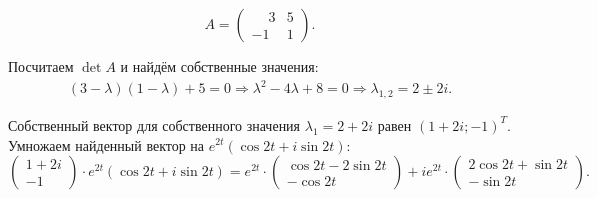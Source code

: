 \begin{ex}
$$
  A = 
  \begin{pmatrix}
    \phantom{-}3 & 5\\
    -1 & 1
  \end{pmatrix}.
$$

Посчитаем $\det{A}$ и найдём
собственные значения:
\begin{gather*}
  (3 - \lambda)(1 - \lambda) + 5 = 0 \Rightarrow
  \lambda^{2} - 4\lambda + 8 = 0 \Rightarrow
  \lambda_{1, 2} = 2 \pm 2i.
\end{gather*}

Собственный вектор
для собственного значения $\lambda_{1} = 2 + 2i$
равен $(1 + 2i; -1)^{T}$.
Умножаем найденный
вектор на $e^{2t}(\cos2t + i\sin2t)$:
\begin{equation*}
  \begin{pmatrix}
    1 + 2i\\
    -1
  \end{pmatrix}
  \cdot e^{2t}(\cos2t + i\sin2t) =
  e^{2t} \cdot
  \begin{pmatrix}
    \cos2t - 2\sin2t\\
    -\cos2t
  \end{pmatrix}
  +
  ie^{2t} \cdot
  \begin{pmatrix}
    2\cos2t + \sin2t\\
    -\sin2t
  \end{pmatrix}.
\end{equation*}


\end{ex}
